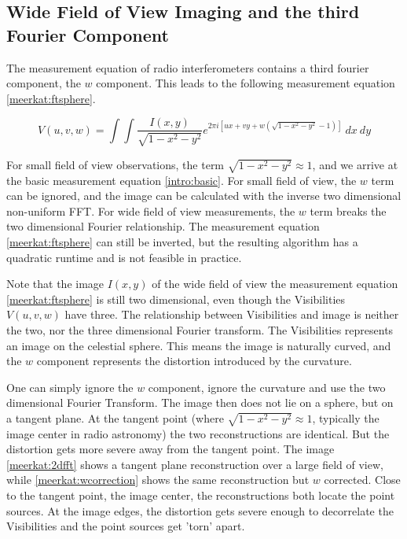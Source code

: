 \subsection{Wide Field of View Imaging and the third Fourier Component} \label{meerkat:wof}
The measurement equation of radio interferometers contains a third fourier component, the $w$ component. This leads to the following measurement equation \eqref{meerkat:ftsphere}.

\begin{equation}\label{meerkat:ftsphere}
V(u, v, w) = \int\int \frac{I(x, y)}{\sqrt{1 - x^2 - y ^2}} e^{2 \pi i [ux+vy+ w(\sqrt{1 - x^2 - y ^2} - 1)]} \: dx \: dy
\end{equation}

For small field of view observations, the term $\sqrt{1 - x^2 - y ^2} \approx 1$, and we arrive at the basic measurement equation \eqref{intro:basic}. For small field of view, the $w$ term can be ignored, and the image can be calculated with the inverse two dimensional non-uniform FFT. For wide field of view measurements, the $w$ term breaks the two dimensional Fourier relationship. The measurement equation \eqref{meerkat:ftsphere} can still be inverted, but the resulting algorithm has a quadratic runtime and is not feasible in practice.

Note that the image $I(x,y)$ of the wide field of view the measurement equation \eqref{meerkat:ftsphere} is still two dimensional, even though the Visibilities $V(u, v, w)$ have three. The relationship between Visibilities and image is neither the two, nor the three dimensional Fourier transform. The Visibilities represents an image on the celestial sphere. This means the image is naturally curved, and the $w$ component represents the distortion introduced by the curvature.

One can simply ignore the $w$ component, ignore the curvature and use the two dimensional Fourier Transform. The image then does not lie on a sphere, but on a tangent plane. At the tangent point (where $\sqrt{1 - x^2 - y ^2} \approx 1$, typically the image center in radio astronomy) the two reconstructions are identical. But the distortion gets more severe away from the tangent point. The image \ref{meerkat:2dfft} shows a tangent plane reconstruction over a large field of view, while \ref{meerkat:wcorrection} shows the same reconstruction but $w$ corrected. Close to the tangent point, the image center, the reconstructions both locate the point sources. At the image edges, the distortion gets severe enough to decorrelate the Visibilities and the point sources get 'torn' apart.

